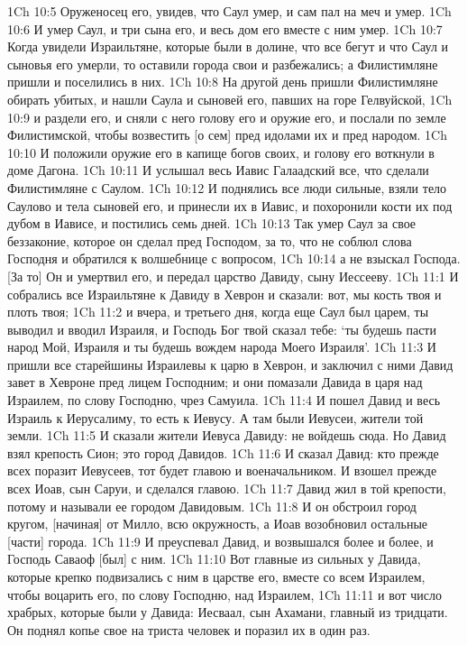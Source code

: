 1Ch 10:5  Оруженосец его, увидев, что Саул умер, и сам пал на меч и умер.
1Ch 10:6  И умер Саул, и три сына его, и весь дом его вместе с ним умер.
1Ch 10:7  Когда увидели Израильтяне, которые были в долине, что все бегут и что Саул и сыновья его умерли, то оставили города свои и разбежались; а Филистимляне пришли и поселились в них.
1Ch 10:8  На другой день пришли Филистимляне обирать убитых, и нашли Саула и сыновей его, павших на горе Гелвуйской,
1Ch 10:9  и раздели его, и сняли с него голову его и оружие его, и послали по земле Филистимской, чтобы возвестить [о сем] пред идолами их и пред народом.
1Ch 10:10  И положили оружие его в капище богов своих, и голову его воткнули в доме Дагона.
1Ch 10:11  И услышал весь Иавис Галаадский все, что сделали Филистимляне с Саулом.
1Ch 10:12  И поднялись все люди сильные, взяли тело Саулово и тела сыновей его, и принесли их в Иавис, и похоронили кости их под дубом в Иависе, и постились семь дней.
1Ch 10:13  Так умер Саул за свое беззаконие, которое он сделал пред Господом, за то, что не соблюл слова Господня и обратился к волшебнице с вопросом,
1Ch 10:14  а не взыскал Господа. [За то] Он и умертвил его, и передал царство Давиду, сыну Иессееву.
1Ch 11:1  И собрались все Израильтяне к Давиду в Хеврон и сказали: вот, мы кость твоя и плоть твоя;
1Ch 11:2  и вчера, и третьего дня, когда еще Саул был царем, ты выводил и вводил Израиля, и Господь Бог твой сказал тебе: `ты будешь пасти народ Мой, Израиля и ты будешь вождем народа Моего Израиля'.
1Ch 11:3  И пришли все старейшины Израилевы к царю в Хеврон, и заключил с ними Давид завет в Хевроне пред лицем Господним; и они помазали Давида в царя над Израилем, по слову Господню, чрез Самуила.
1Ch 11:4  И пошел Давид и весь Израиль к Иерусалиму, то есть к Иевусу. А там были Иевусеи, жители той земли.
1Ch 11:5  И сказали жители Иевуса Давиду: не войдешь сюда. Но Давид взял крепость Сион; это город Давидов.
1Ch 11:6  И сказал Давид: кто прежде всех поразит Иевусеев, тот будет главою и военачальником. И взошел прежде всех Иоав, сын Саруи, и сделался главою.
1Ch 11:7  Давид жил в той крепости, потому и называли ее городом Давидовым.
1Ch 11:8  И он обстроил город кругом, [начиная] от Милло, всю окружность, а Иоав возобновил остальные [части] города.
1Ch 11:9  И преуспевал Давид, и возвышался более и более, и Господь Саваоф [был] с ним.
1Ch 11:10  Вот главные из сильных у Давида, которые крепко подвизались с ним в царстве его, вместе со всем Израилем, чтобы воцарить его, по слову Господню, над Израилем,
1Ch 11:11  и вот число храбрых, которые были у Давида: Иесваал, сын Ахамани, главный из тридцати. Он поднял копье свое на триста человек и поразил их в один раз.

